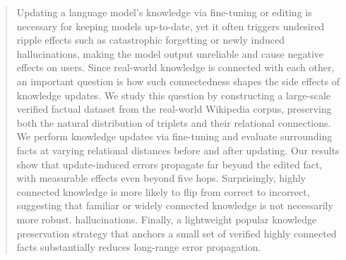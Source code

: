 \begin{abstract}
Updating a language model’s knowledge via fine-tuning or editing is necessary for keeping models up-to-date, yet it often triggers undesired ripple effects such as catastrophic forgetting or newly induced hallucinations, making the model output unreliable and cause negative effects on users. Since real-world knowledge is connected with each other, an important question is how such connectedness shapes the side effects of knowledge updates.
We study this question by constructing a large-scale verified factual dataset from the real-world Wikipedia corpus, preserving both the natural distribution of triplets and their relational connections. We perform knowledge updates via fine-tuning and evaluate surrounding facts at varying relational distances before and after updating.
Our results show that update-induced errors propagate far beyond the edited fact, with measurable effects even beyond five hops. Surprisingly, highly connected knowledge is more likely to flip from correct to incorrect, suggesting that familiar or widely connected knowledge is not necessarily more robust. hallucinations. Finally, a lightweight popular knowledge preservation strategy that anchors a small set of verified highly connected facts substantially reduces long-range error propagation.
\end{abstract}


